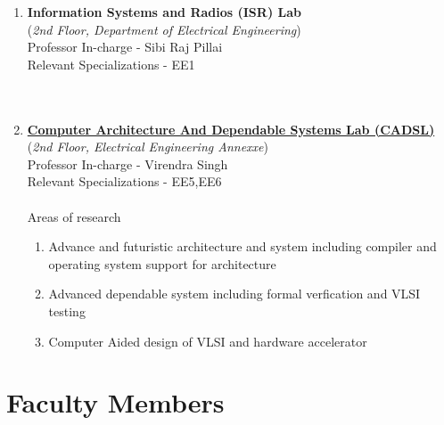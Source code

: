 \documentclass[openany]{book} %
\begin{document}
\begin{enumerate}
\item \textbf{Information Systems and Radios (ISR) Lab}\\
    (\textit{2nd Floor, Department of Electrical Engineering})\\
    Professor In-charge - Sibi Raj Pillai\\
Relevant Specializations - EE1\\
\\
\\
\item \href{https://www.ee.iitb.ac.in/student/~cadsl/} {\color{blue} \textbf{Computer Architecture And Dependable Systems Lab (CADSL)}}\\
    (\textit{2nd Floor, Electrical Engineering Annexxe})\\
    Professor In-charge - Virendra Singh\\
Relevant Specializations - EE5,EE6\\
\\
Areas of research
\begin{enumerate}
	\item Advance and futuristic architecture and system including compiler and operating system support for architecture
	\item Advanced dependable system including formal verfication and VLSI testing
	\item Computer Aided design of VLSI and hardware accelerator
\end{enumerate}
 
\end{enumerate}
\chapter{Faculty Members}
\end{document}
